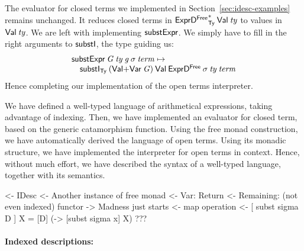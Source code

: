 The evaluator for closed terms we implemented in
Section~\ref{sec:idesc-examples} remains unchanged. It reduces closed
terms in $\FreeIMonad{\HExprFreeD}{\Ty}{\SYMBVal}\: \V{ty}$ to values in
$\Val{\V{ty}}$. We are left with implementing $\substH$. We simply
have to fill in the right arguments to $\substI$, the type guiding us:
%
\[\stk{
\substH\: \V{G}\:
          \V{ty}\:          
          \V{g}\:
          \V{\sigma}\: 
          \V{term} \mapsto  \\
\quad \substI_{\Ty}\:
               (\SUM{\SYMBVal}{\SYMBVar\: \V{G}})\: 
               \SYMBVal\:
               \HExprFreeD\: 
               \V{\sigma}\:
               \V{ty}\:
               \V{term}
}\]
%
Hence completing our implementation of the open terms interpreter. 

We have defined a well-typed language of arithmetical expressions,
taking advantage of indexing. Then, we have implemented an evaluator
for closed term, based on the generic catamorphism function. Using the
free monad construction, we have automatically derived the language of
open terms. Using its monadic structure, we have implemented the
interpreter for open terms in context. Hence, without much effort, we
have described the syntax of a well-typed language, together with its
semantics.

\begin{wstructure}
<- IDesc
    <- Another instance of free monad
        <- Var: Return
        <- Remaining: (not even indexed) functor
    -> Madness just starts
        <- map operation
        <- [ subst sigma D ] X = [D] (\x -> [subst sigma x] X)
        ???
\end{wstructure}

\paragraph{Indexed descriptions:}

